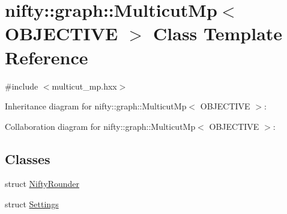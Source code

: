 \hypertarget{classnifty_1_1graph_1_1MulticutMp}{}\section{nifty\+:\+:graph\+:\+:Multicut\+Mp$<$ O\+B\+J\+E\+C\+T\+I\+V\+E $>$ Class Template Reference}
\label{classnifty_1_1graph_1_1MulticutMp}


{\ttfamily \#include $<$multicut\+\_\+mp.\+hxx$>$}



Inheritance diagram for nifty\+:\+:graph\+:\+:Multicut\+Mp$<$ O\+B\+J\+E\+C\+T\+I\+V\+E $>$\+:


Collaboration diagram for nifty\+:\+:graph\+:\+:Multicut\+Mp$<$ O\+B\+J\+E\+C\+T\+I\+V\+E $>$\+:
\subsection*{Classes}
\begin{DoxyCompactItemize}
\item 
struct \hyperlink{structnifty_1_1graph_1_1MulticutMp_1_1NiftyRounder}{Nifty\+Rounder}
\item 
struct \hyperlink{structnifty_1_1graph_1_1MulticutMp_1_1Settings}{Settings}
\end{DoxyCompactItemize}
